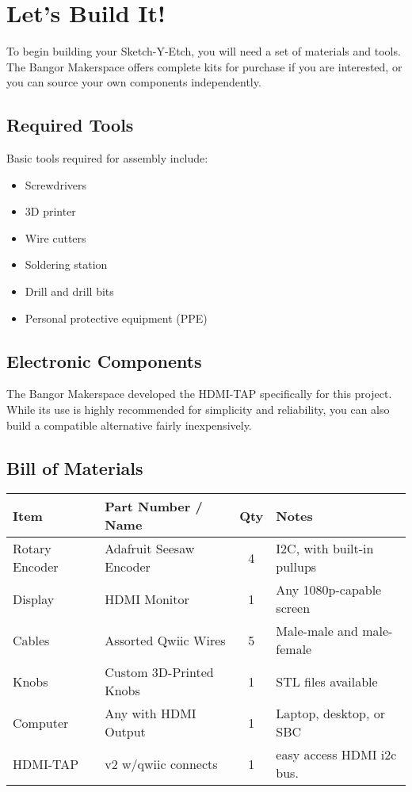 \documentclass[]{article}
\begin{document}
\section*{Let's Build It!}

To begin building your Sketch-Y-Etch, you will need a set of materials and tools.  
The Bangor Makerspace offers complete kits for purchase if you are interested, or you can source your own components independently.

\subsection*{Required Tools}

Basic tools required for assembly include:
\begin{itemize}
	\item Screwdrivers
	\item 3D printer
	\item Wire cutters
	\item Soldering station
	\item Drill and drill bits
	\item Personal protective equipment (PPE)
\end{itemize}

\subsection*{Electronic Components}

The Bangor Makerspace developed the HDMI-TAP specifically for this project. While its use is highly recommended for simplicity and reliability, you can also build a compatible alternative fairly inexpensively.

\subsection*{Bill of Materials}

\begin{center}
	\begin{tabular}{|l|l|c|l|}
		\hline
		\textbf{Item} & \textbf{Part Number / Name} & \textbf{Qty} & \textbf{Notes} \\
		\hline
		Rotary Encoder & Adafruit Seesaw Encoder  & 4 & I2C, with built-in pullups \\
		Display         & HDMI Monitor             & 1 & Any 1080p-capable screen \\
		Cables          & Assorted Qwiic Wires      & 5 & Male-male and male-female \\
		Knobs           & Custom 3D-Printed Knobs   & 1 & STL files available \\
		Computer        & Any with HDMI Output       & 1 & Laptop, desktop, or SBC \\
		HDMI-TAP        & v2 w/qwiic connects		&1&  easy access HDMI i2c bus.\\
		
		\hline
	\end{tabular}
\end{center}
\end{document}
